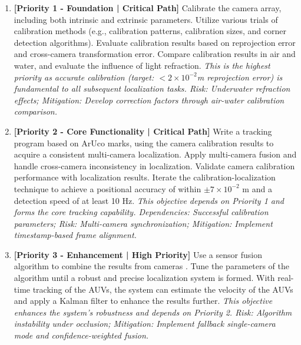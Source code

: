 \documentclass[11pt]{article}
\begin{document}
    \begin{enumerate}
        \item \textbf{[Priority 1 - Foundation | Critical Path]} Calibrate the camera array, including both intrinsic and extrinsic parameters. Utilize various trials of calibration methods (e.g., calibration patterns, calibration sizes, and corner detection algorithms). Evaluate calibration results based on reprojection error and cross-camera transformation error. Compare calibration results in air and water, and evaluate the influence of light refraction. \textit{This is the highest priority as accurate calibration (target: $<2\times10^{-2}$m reprojection error) is fundamental to all subsequent localization tasks. Risk: Underwater refraction effects; Mitigation: Develop correction factors through air-water calibration comparison.}

        \item \textbf{[Priority 2 - Core Functionality | Critical Path]} Write a tracking program based on ArUco marks, using the camera calibration results to acquire a consistent multi-camera localization. Apply multi-camera fusion and handle cross-camera inconsistency in localization. Validate camera calibration performance with localization results. Iterate the calibration-localization technique to achieve a positional accuracy of within $\pm 7\times10^{-2}$ m and a detection speed of at least 10 Hz. \textit{This objective depends on Priority 1 and forms the core tracking capability. Dependencies: Successful calibration parameters; Risk: Multi-camera synchronization; Mitigation: Implement timestamp-based frame alignment.}

        \item \textbf{[Priority 3 - Enhancement | High Priority]} Use a sensor fusion algorithm to combine the results from cameras%
        . Tune the parameters of the algorithm until a robust and precise localization system is formed. With real-time tracking of the AUVs, the system can estimate the velocity of the AUVs and apply a Kalman filter to enhance the results further. \textit{This objective enhances the system's robustness and depends on Priority 2. Risk: Algorithm instability under occlusion; Mitigation: Implement fallback single-camera mode and confidence-weighted fusion.}


\end{enumerate}
\end{document}
